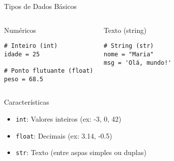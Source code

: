 \begin{frame}[fragile]{Tipos de Dados Básicos}
    \begin{columns}[T]

        \begin{block}{Numéricos}
            \begin{verbatim}
# Inteiro (int)
idade = 25

# Ponto flutuante (float)
peso = 68.5
\end{verbatim}
        \end{block}

        \begin{block}{Texto (string)}
            \begin{verbatim}
# String (str)
nome = "Maria"
msg = 'Olá, mundo!'
\end{verbatim}
        \end{block}

    \end{columns}

    \begin{alertblock}{Características}
        \begin{itemize}
            \item \texttt{int}: Valores inteiros (ex: -3, 0, 42)
            \item \texttt{float}: Decimais (ex: 3.14, -0.5)
            \item \texttt{str}: Texto (entre aspas simples ou duplas)
        \end{itemize}
    \end{alertblock}
\end{frame}

